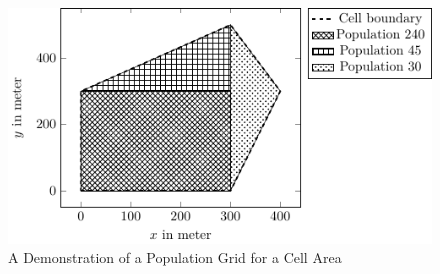 \documentclass[master,english]{hgbthesis}
\begin{document}
\begin{figure}
	\centering
	\includegraphics[width=\columnwidth]{./images/population_cell}
%
%
%
%
%
%
%
	\caption{A Demonstration of a Population Grid for a Cell Area}
	\label{fig:population}
\end{figure}
\end{document}
